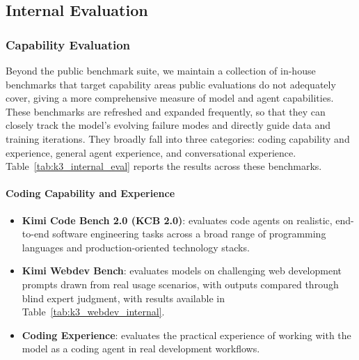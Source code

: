 \subsection{Internal Evaluation}
\label{sec:eval_internal}

\subsubsection{Capability Evaluation}
Beyond the public benchmark suite, we maintain a collection of in-house benchmarks that target capability areas public evaluations do not adequately cover, giving a more comprehensive measure of model and agent capabilities. These benchmarks are refreshed and expanded frequently, so that they can closely track the model's evolving failure modes and directly guide data and training iterations. They broadly fall into three categories: coding capability and experience, general agent experience, and conversational experience. Table~\ref{tab:k3_internal_eval} reports the results across these benchmarks.






\paragraph{Coding Capability and Experience}
\begin{itemize}[leftmargin=12pt]
  \item \textbf{Kimi Code Bench 2.0 (KCB 2.0)}: evaluates code agents on realistic, end-to-end software engineering tasks across a broad range of programming languages and production-oriented technology stacks. %
  \item \textbf{Kimi Webdev Bench}: evaluates models on challenging web development prompts drawn from real usage scenarios, with outputs compared through blind expert judgment, with results available in Table~\ref{tab:k3_webdev_internal}.
  \item \textbf{Coding Experience}: evaluates the practical experience of working with the model as a coding agent in real development workflows.
\end{itemize}



